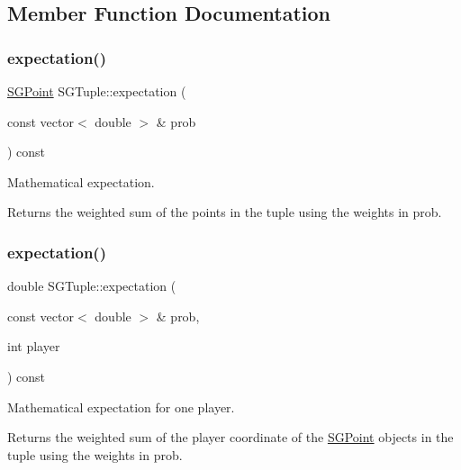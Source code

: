 \subsection{Member Function Documentation}
\mbox{\label{classSGTuple_a14d24373f31ea778f4beeff688b6e4d0}} 
\subsubsection{\texorpdfstring{expectation()}{expectation()}\hspace{0.1cm}{\footnotesize\ttfamily [1/2]}}
{\footnotesize\ttfamily \hyperlink{classSGPoint}{S\+G\+Point} S\+G\+Tuple\+::expectation (\begin{DoxyParamCaption}\item[{const vector$<$ double $>$ \&}]{prob }\end{DoxyParamCaption}) const}



Mathematical expectation. 

Returns the weighted sum of the points in the tuple using the weights in prob. \mbox{\label{classSGTuple_aadc035860158d0e57acbaef6c56265d9}} 
\subsubsection{\texorpdfstring{expectation()}{expectation()}\hspace{0.1cm}{\footnotesize\ttfamily [2/2]}}
{\footnotesize\ttfamily double S\+G\+Tuple\+::expectation (\begin{DoxyParamCaption}\item[{const vector$<$ double $>$ \&}]{prob,  }\item[{int}]{player }\end{DoxyParamCaption}) const}



Mathematical expectation for one player. 

Returns the weighted sum of the player coordinate of the \hyperlink{classSGPoint}{S\+G\+Point} objects in the tuple using the weights in prob. \mbox{\label{classSGTuple_aa57ae522bea33db282722a1e2a33bd0d}} 

